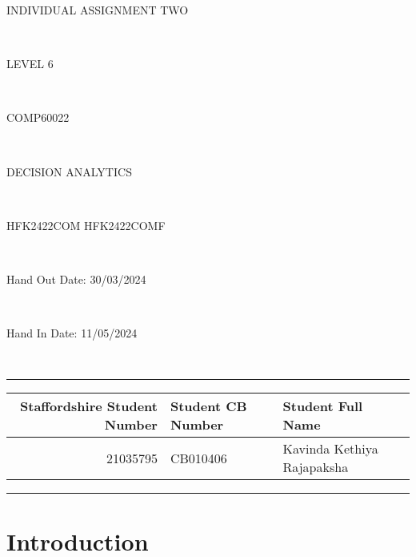 \documentclass[12pt,a4Paper]{article}
\begin{document}
\begin{titlepage}
\begin{center}
	\begin{Huge}
	INDIVIDUAL ASSIGNMENT TWO
	\end{Huge}\\[1cm]
    \begin{Large}
    LEVEL 6
    \end{Large}\\[0.5cm]
    \begin{Large}
    COMP60022
    \end{Large}\\[1cm]
    \begin{huge}
    DECISION ANALYTICS
    \end{huge}\\[0.5cm]
    \begin{LARGE}
    HFK2422COM HFK2422COMF
    \end{LARGE}\\[1cm]
    \begin{large}
    Hand Out Date: 30/03/2024
    \end{large}\\[0.5cm]
    \begin{large}
    Hand In Date: 11/05/2024
    \end{large}\\[1cm]
    \hrule
    \vspace{1cm}
    \begin{center}
    \begin{tabular}{rll}\hline
    \textbf{Staffordshire Student Number} & \textbf{Student CB Number} & \textbf{Student Full Name}\\\hline
     21035795 & CB010406 & Kavinda Kethiya Rajapaksha\\\hline
    \end{tabular}
    \end{center}
    \vspace{1cm}
    \hrule
\end{center}
\end{titlepage}
\tableofcontents
\newpage
\listoftables
\listoffigures
\newpage
\section{Introduction}
\end{document}
